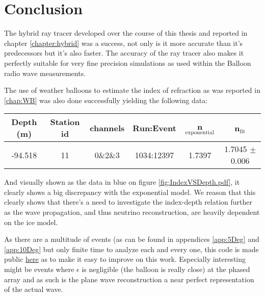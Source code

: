 \chapter*{Conclusion}
The hybrid ray tracer developed over the course of this thesis and reported in
chapter \ref{chapter:hybrid} was a success, not only is it more accurate than
it's predecessors but it's also faster.  The accuracy of the ray tracer also
makes it perfectly suitable for very fine precision simulations as used within
the Balloon radio wave measurements.

The use of weather balloons to estimate the index of refraction as
was reported in \ref{chap:WB} was also done successfully 
yielding the following data:
\begin{center}
\begin{tabular}{||c c c c c c||}
 \hline
 Depth (m) & Station id & channels & Run:Event & n$_\text{exponential}$ & n$_\text{fit}$\\ [0.5ex]
 \hline\hline
 -94.518 & 11 & 0\&2\&3 & 1034:12397 & 1.7397 & 1.7045 $\pm$ 0.006 \\
 \hline
\end{tabular}
\end{center}
And visually shown as the data in blue on figure \ref{fig:IndexVSDepth.pdf},
it clearly shows a big discrepancy with the exponential model.
We reason that this clearly shows that there's a need to investigate
the index-depth relation further as the wave propagation, and thus
neutrino reconstruction, are heavily dependent on the ice model.

As there are a multitude of events (as can be found in appendices
\ref{app:5Deg} and \ref{app:10Deg} but only finite time to analyze each and
every one, this code is made public
\href{https://github.com/arthuradriaens-code/projects-mt.git}{here} as to make
it easy to improve on this work.  Especially interesting might be events where
$\epsilon$ is negligible (the balloon is really close) at the phased array and
as such is the plane wave reconstruction a near perfect representation of the
actual wave.

